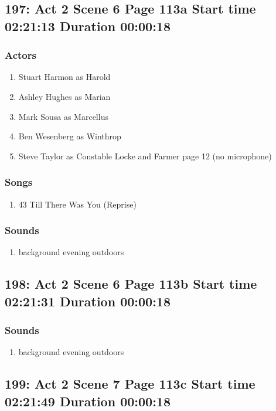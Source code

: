 \subsection{197: Act 2 Scene 6 Page 113a Start time 02:21:13 Duration 00:00:18}

\subsubsection{Actors}
\begin{enumerate}
\item Stuart Harmon as Harold
\item Ashley Hughes as Marian
\item Mark Sousa as Marcellus
\item Ben Wesenberg as Winthrop
\item Steve Taylor as Constable Locke and Farmer page 12 (no microphone)
\end{enumerate}

\subsubsection{Songs}
\begin{enumerate}
\item 43 Till There Was You (Reprise)
\end{enumerate}\subsubsection{Sounds}
\begin{enumerate}
\item background evening outdoors
\end{enumerate}
\subsection{198: Act 2 Scene 6 Page 113b Start time 02:21:31 Duration 00:00:18}
\subsubsection{Sounds}
\begin{enumerate}
\item background evening outdoors
\end{enumerate}
\subsection{199: Act 2 Scene 7 Page 113c Start time 02:21:49 Duration 00:00:18}

